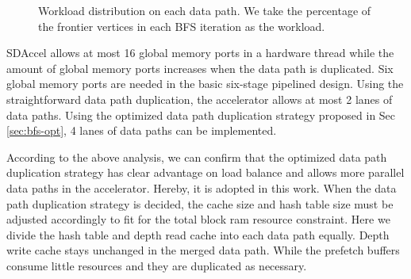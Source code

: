 \begin{figure}
    \caption{Workload distribution on each data path. We take the percentage of 
    the frontier vertices in each BFS iteration as the workload.}
\label{fig:load-balance}
\end{figure}

SDAccel allows at most 16 global memory ports in a hardware thread while 
the amount of global memory ports increases when the data path is duplicated.
Six global memory ports are needed in the basic six-stage pipelined design.
Using the straightforward data path duplication, the accelerator allows 
at most 2 lanes of data paths. Using the optimized data path duplication strategy 
proposed in Sec \ref{sec:bfs-opt}, 4 lanes of data paths can be implemented.

According to the above analysis, we can confirm that the optimized data path duplication 
strategy has clear advantage on load balance and allows more 
parallel data paths in the accelerator. Hereby, it is adopted in this work.
When the data path duplication strategy is decided, the cache size and hash 
table size must be adjusted accordingly to fit for the total block ram resource 
constraint. Here we divide the hash table and depth read cache into each data 
path equally. Depth write cache stays unchanged in the merged data path. 
While the prefetch buffers consume little resources and they are duplicated 
as necessary. 



